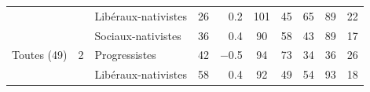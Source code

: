 {\begin{tabular}{lclcrccccc}
 &  & \cellcolor{ccdroit!15}Libéraux-nativistes & \cellcolor{ccdroit!15}26 & \cellcolor{ccdroit!15}0.2\hspace{1.5em} & \cellcolor{ccdroit!15}101 & \cellcolor{ccdroit!15}45 & \cellcolor{ccdroit!15}65 & \cellcolor{ccdroit!15}89 & \cellcolor{ccdroit!15}22 \\
 &  & \cellcolor{ced!15}Sociaux-nativistes & \cellcolor{ced!15}36 & \cellcolor{ced!15}0.4\hspace{1.5em} & \cellcolor{ced!15}90 & \cellcolor{ced!15}58 & \cellcolor{ced!15}43 & \cellcolor{ced!15}89 & \cellcolor{ced!15}17 \\
\midrule
Toutes (49) & 2 & \cellcolor{cleft!15}Progressistes & \cellcolor{cleft!15}42 & \cellcolor{cleft!15}$-$0.5\hspace{1.5em} & \cellcolor{cleft!15}94 & \cellcolor{cleft!15}73 & \cellcolor{cleft!15}34 & \cellcolor{cleft!15}36 & \cellcolor{cleft!15}26 \\
 &  & \cellcolor{ccdroit!15}Libéraux-nativistes & \cellcolor{ccdroit!15}58 & \cellcolor{ccdroit!15}0.4\hspace{1.5em} & \cellcolor{ccdroit!15}92 & \cellcolor{ccdroit!15}49 & \cellcolor{ccdroit!15}54 & \cellcolor{ccdroit!15}93 & \cellcolor{ccdroit!15}18 \\

\end{tabular}}
